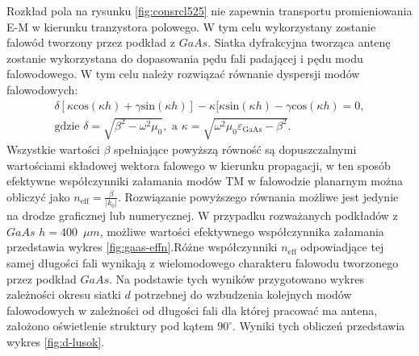 Rozkład pola na rysunku \ref{fig:consrcl525} nie zapewnia transportu promieniowania E-M w kierunku tranzystora polowego. W tym celu wykorzystany zostanie falowód tworzony przez podkład z $GaAs$. Siatka dyfrakcyjna tworząca antenę zostanie wykorzystana do dopasowania pędu fali padającej i pędu modu falowodowego. W tym celu należy rozwiązać równanie dyspersji modów falowodowych\cite{petykiewicz1989podstawy}:
\begin{equation}
	\begin{gathered}
	\delta [ \kappa \textrm{cos}(\kappa h) + \gamma\textrm{sin}(\kappa h) ] - \kappa [ \kappa \textrm{sin}(\kappa h) - \gamma \textrm{cos}(\kappa h) = 0,\\
	\textrm{gdzie }\delta=\sqrt{\beta^2-\omega^2\mu_0},\textrm{ a }\kappa=\sqrt{\omega^2\mu_0\varepsilon_{\textrm{GaAs}}-\beta^2}.
	\end{gathered}
\end{equation}
Wszystkie wartości $\beta$ spełniające powyższą równość są dopuszczalnymi wartościami składowej wektora falowego w kierunku propagacji, w ten sposób efektywne współczynniki załamania modów TM w falowodzie planarnym można obliczyć jako $n_{\textrm{eff}}=\frac{\beta}{|k_0|}$. Rozwiązanie powyższego równania możliwe jest jedynie na drodze graficznej lub numerycznej. W przypadku rozważanych podkładów z $GaAs$ $h=400$~$\mu m$, możliwe wartości efektywnego współczynnika załamania przedstawia wykres \ref{fig:gaas-effn}.Różne współczynniki $n_{\textrm{eff}}$ odpowiadjące tej samej długości fali wynikają z wielomodowego charakteru falowodu tworzonego przez podkład $GaAs$. Na podstawie tych wyników przygotowano wykres zależności okresu siatki $d$ potrzebnej do wzbudzenia kolejnych modów falowodowych w zależności od długości fali dla której pracować ma antena, założono oświetlenie struktury pod kątem $90^{\circ}$. Wyniki tych obliczeń przedstawia wykres \ref{fig:d-lusok}.

